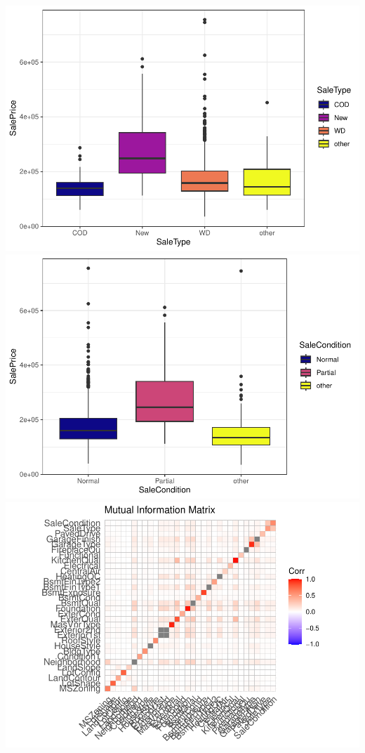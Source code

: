 \documentclass[
]{article}
\begin{document}
\includegraphics{report_files/figure-latex/categorical variables-31.pdf}
\includegraphics{report_files/figure-latex/categorical variables-32.pdf}
\includegraphics{report_files/figure-latex/categorical variables-33.pdf}
\end{document}
